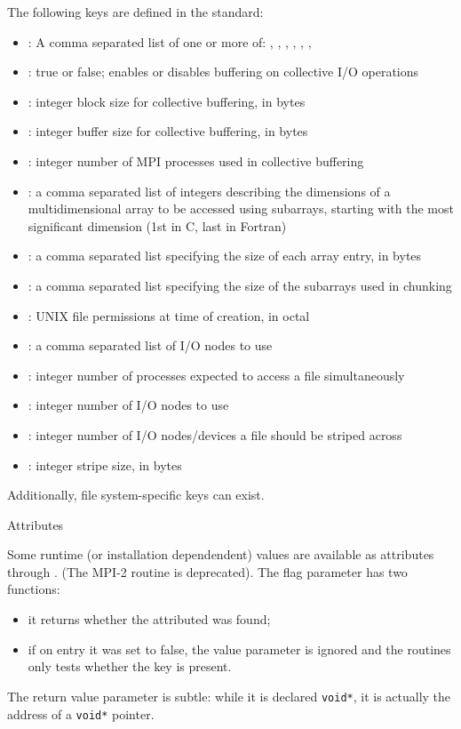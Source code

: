 The following keys are defined in the  standard:
\begin{itemize}
\item {}: A comma separated list of one or
  more of: , , ,
  , , , 
\item {}: true or false; enables or disables buffering on collective I/O operations
\item {}: integer block size for collective buffering, in bytes
\item {}: integer buffer size for collective buffering, in bytes
\item {}: integer number of MPI processes used in collective buffering
\item {}: a comma separated list of integers describing the dimensions of a multidimensional array to be accessed using subarrays, starting with the most significant dimension (1st in C, last in Fortran)
\item {}: a comma separated list specifying the size of each array entry, in bytes
\item {}: a comma separated list specifying the size of the subarrays used in chunking
\item {}: UNIX file permissions at time of creation, in octal
\item {}: a comma separated list of I/O nodes to use
\item {}: integer number of processes expected to access a file simultaneously
\item {}: integer number of I/O nodes to use
\item {}: integer number of I/O nodes/devices a file should be striped across
\item {}: integer stripe size, in bytes
\end{itemize}
Additionally, file system-specific keys can exist.

 {Attributes}
\label{sec:mpi_attr}

Some runtime (or installation dependendent) values are available as
attributes through
.
(The MPI-2 routine  is deprecated).
The flag parameter has two functions:
\begin{itemize}
\item it returns whether the attributed was found;
\item if on entry it was set to false, the value parameter is ignored
  and the routines only tests whether the key is present.
\end{itemize}
The return value parameter is subtle: while it is declared \lstinline{void*},
it is actually the address of a \lstinline{void*} pointer.


